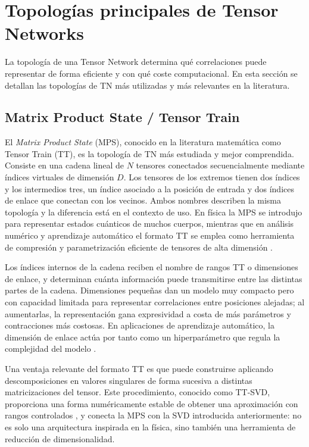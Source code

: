 \section{Topologías principales de Tensor Networks}

La topología de una Tensor Network determina qué correlaciones puede representar de forma eficiente y con qué coste computacional. En esta sección se detallan las topologías de TN más utilizadas y más relevantes en la literatura.

\subsection{Matrix Product State / Tensor Train}

El \textit{Matrix Product State} (MPS), conocido en la literatura matemática como Tensor Train (TT), es la topología de TN más estudiada y mejor comprendida. Consiste en una cadena lineal de $N$ tensores conectados secuencialmente mediante índices virtuales de dimensión $D$. Los tensores de los extremos tienen dos índices y los intermedios tres, un índice asociado a la posición de entrada y dos índices de enlace que conectan con los vecinos. Ambos nombres describen la misma topología y la diferencia está en el contexto de uso. En física la MPS se introdujo para representar estados cuánticos de muchos cuerpos, mientras que en análisis numérico y aprendizaje automático el formato TT se emplea como herramienta de compresión y parametrización eficiente de tensores de alta dimensión .

Los índices internos de la cadena reciben el nombre de rangos TT o dimensiones de enlace, y determinan cuánta información puede transmitirse entre las distintas partes de la cadena. Dimensiones pequeñas dan un modelo muy compacto pero con capacidad limitada para representar correlaciones entre posiciones alejadas; al aumentarlas, la representación gana expresividad a costa de más parámetros y contracciones más costosas. En aplicaciones de aprendizaje automático, la dimensión de enlace actúa por tanto como un hiperparámetro que regula la complejidad del modelo .

Una ventaja relevante del formato TT es que puede construirse aplicando descomposiciones en valores singulares de forma sucesiva a distintas matricizaciones del tensor. Este procedimiento, conocido como TT-SVD, proporciona una forma numéricamente estable de obtener una aproximación con rangos controlados , y conecta la MPS con la SVD introducida anteriormente: no es solo una arquitectura inspirada en la física, sino también una herramienta de reducción de dimensionalidad.

